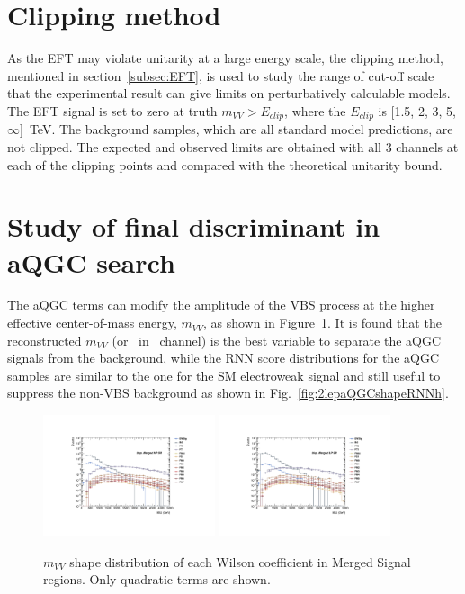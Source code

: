 \section{Clipping method}
\label{subsec:clipping}
As the EFT may violate unitarity at a large energy scale, the clipping method, mentioned in section~\ref{subsec:EFT}, is used to study the range of cut-off scale that the experimental result can give limits on perturbatively calculable models.
The EFT signal is set to zero at truth $m_{VV} > E_{clip}$, where the $E_{clip}$ is [1.5, 2, 3, 5, $\infty$]~TeV. 
The background samples, which are all standard model predictions, are not clipped.
The expected and observed limits are obtained with all 3 channels at each of the clipping points and compared with the theoretical unitarity bound.

\section{Study of final discriminant in aQGC search}
\label{subsec:2binapproach}
The aQGC terms can modify the amplitude of the VBS process at the higher effective center-of-mass energy, $m_{VV}$, as shown in Figure~\ref{fig:2lepaQGCshapeMVVh}.
It is found that the reconstructed $m_{VV}$ (or \mt\ in \zlep\ channel) is the best variable to separate the aQGC signals from the background,
while the RNN score distributions for the aQGC samples are similar to the one for the SM electroweak signal and still useful to suppress the non-VBS background as shown in Fig.~\ref{fig:2lepaQGCshapeRNNh}.
\begin{figure}[]
    \centering
   \includegraphics[width=0.45\textwidth]{figures/aQGC/MllJ_SR_HP_aQGC.pdf}
   \includegraphics[width=0.45\textwidth]{figures/aQGC/MllJ_SR_LP_aQGC.pdf}
    \caption{$m_{VV}$ shape distribution of each Wilson coefficient in Merged Signal regions. Only quadratic terms are shown.}
    \label{fig:2lepaQGCshapeMVVh}
\end{figure}

